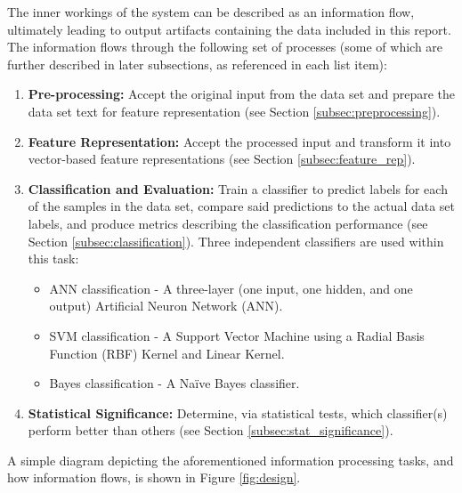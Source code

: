 \documentclass[conference]{sig-alternate-05-2015}
\begin{document}
The inner workings of the system can be described as an information flow,
ultimately leading to output artifacts containing the data included in this
report. The information flows through the following set of processes (some of
which are further described in later subsections, as referenced in each list
item):
\begin{enumerate}
  \item \textbf{Pre-processing:} Accept the original input from the data set and
  prepare the data set text for feature representation (see Section
  \ref{subsec:preprocessing}).
  \item \textbf{Feature Representation:} Accept the processed input and
  transform it into vector-based feature representations (see Section
  \ref{subsec:feature_rep}).
  \item \textbf{Classification and Evaluation:} Train a classifier to predict
  labels for each of the samples in the data set, compare said predictions to
  the actual data set labels, and produce metrics describing the classification
  performance (see Section \ref{subsec:classification}). Three independent
  classifiers are used within this task:
  \begin{itemize}
    \item ANN classification - A three-layer (one input, one hidden, and
    one output) Artificial Neuron Network (ANN).
    \item SVM classification - A Support Vector Machine using a Radial Basis Function (RBF) Kernel and Linear Kernel.
    \item Bayes classification - A Na\"{i}ve Bayes classifier.
  \end{itemize}
  \item \textbf{Statistical Significance:} Determine, via statistical tests,
  which classifier(s) perform better than others (see Section
  \ref{subsec:stat_significance}).
\end{enumerate}

A simple diagram depicting the aforementioned information processing tasks, and
how information flows, is shown in Figure \ref{fig:design}.
\end{document}
